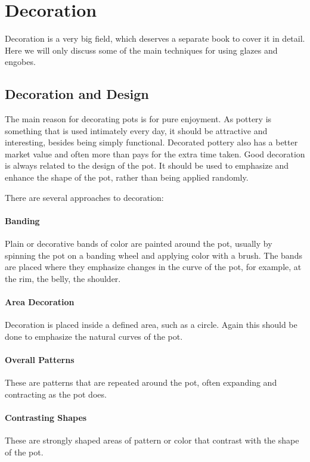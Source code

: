 \chapter{Decoration}
Decoration is a very big field, which deserves a separate book to cover it in 
detail. Here we will only discuss some of the main techniques for using glazes 
and engobes.
\section{Decoration and Design}
The main reason for decorating pots is for pure enjoyment. As pottery is 
something that is used intimately every day, it should be attractive and 
interesting, besides being simply functional. Decorated pottery also has a 
better market value and often more than pays for the extra time taken.
Good decoration is always related to the design of the pot. It should be used 
to emphasize and enhance the shape of the pot, rather than being applied 
randomly.

There are several approaches to decoration:
\subsubsection{Banding}
Plain or decorative bands of color are painted around the pot, usually by 
spinning the pot on a banding wheel and applying color with a brush. The bands 
are placed where they emphasize changes in the curve of the pot, for example, 
at the rim, the belly, the shoulder.
\subsubsection{Area Decoration}
Decoration is placed inside a defined area, such as a circle. Again this should 
be done to emphasize the natural curves of the pot.
\subsubsection{Overall Patterns}
These are patterns that are repeated around the pot, often expanding and 
contracting as the pot does.
\subsubsection{Contrasting Shapes}
These are strongly shaped areas of pattern or color that contrast with the 
shape of the pot.
